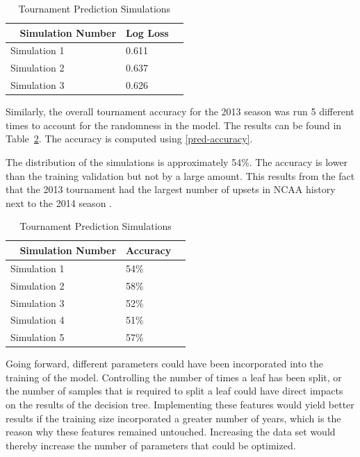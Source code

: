 \documentclass[conference]{IEEEtran}
\begin{document}
{\begin{table}[H]
	\centering
    \begin{tabular}{|l|l|l|}
    \hline
    ~   \textbf{Simulation Number}  & \textbf{Log Loss} \\ \hline
    Simulation 1 & 0.611  \\ \hline
    Simulation 2 & 0.637\\ \hline
    Simulation 3 &  0.626\\ \hline
    \end{tabular}
    \caption {Tournament Prediction Simulations}
    \label{tab:ll_table}
\end{table}

Similarly, the overall tournament accuracy for the 2013 season was run 5 different times to account for the randomness in the model. The results can be found in Table~\ref{tab:thetable}. 
The accuracy is computed using \eqref{pred-accuracy}.

The distribution of the simulations is approximately 54\%.
The accuracy is lower than the training validation but not by a large amount. 
This results from the fact that the 2013 tournament had the largest number of upsets in NCAA history next to the 2014 season \cite{BenZauzmer:2014}.
 
\begin{table}[H]
	\centering
    \begin{tabular}{|l|l|l|}
    \hline
    ~   \textbf{Simulation Number}  & \textbf{Accuracy} \\ \hline
    Simulation 1 & 54\%  \\ \hline
    Simulation 2 & 58\% \\ \hline
    Simulation 3 & 52\% \\ \hline
    Simulation 4 & 51\% \\ \hline
    Simulation 5 & 57\%\\ \hline
    \end{tabular}
    \caption {Tournament Prediction Simulations}
    \label{tab:thetable}
\end{table}

Going forward, different parameters could have been incorporated into the training of the model. Controlling the number of times a leaf has been split, or the number of samples that is required to split a leaf could have direct impacts on the results of the decision tree. Implementing these features would yield better results if the training size incorporated a greater number of years, which is the reason why these features remained untouched. Increasing the data set would thereby increase the number of parameters that could be optimized. 


}
\end{document}
